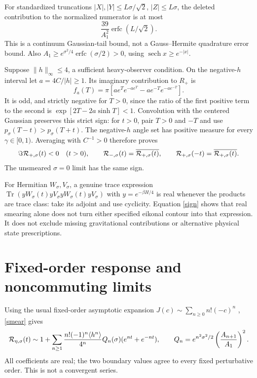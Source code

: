 \documentclass[11pt,a4paper]{article}
\begin{document}
For standardized truncations $|X|,|Y|\le L\sigma/\sqrt2$,
$|Z|\le L\sigma$, the deleted contribution to the normalized numerator
is at most
\[
 \frac{39}{A_1^2}\operatorname{erfc}(L/\sqrt2).
 \label{tail}
\]
This is a continuum Gaussian-tail bound, not a Gauss--Hermite
quadrature error bound. Also
$A_1\ge e^{\sigma^2/4}\operatorname{erfc}(\sigma/2)>0$,
using $\operatorname{sech}x\ge e^{-|x|}$.

Suppose $\|h\|_\infty\le4$, a sufficient heavy-observer condition.
On the negative-$h$ interval let $a=4C/|h|\ge1$. Its imaginary
contribution to $R_+$ is
\[
 f_a(T)=\pi\left[ae^T e^{-ae^T}-ae^{-T}e^{-ae^{-T}}\right].
\]
It is odd, and strictly negative for $T>0$, since the ratio of
the first positive term to the second is
$\exp[2T-2a\sinh T]<1$.
Convolution with the centered Gaussian preserves this strict sign:
for $t>0$, pair $T>0$ and $-T$ and use
$p_\sigma(T-t)>p_\sigma(T+t)$.
The negative-$h$ angle set has positive measure for every
$\gamma\in[0,1)$. Averaging with $C^{-1}>0$ therefore proves
\begin{equation}
 \Im{\cal R}_{+,\sigma}(t)<0\quad(t>0),\qquad
 {\cal R}_{-,\sigma}(t)=\overline{{\cal R}_{+,\sigma}(t)},\qquad
 {\cal R}_{+,\sigma}(-t)=\overline{{\cal R}_{+,\sigma}(t)} .
 \label{sign}
\end{equation}
The unsmeared $\sigma=0$ limit has the same sign.

For Hermitian $W_\sigma,V_\sigma$, a genuine trace expression
$\operatorname{Tr}(yW_\sigma(t)yV_\sigma yW_\sigma(t)yV_\sigma)$
with $y=e^{-\beta H/4}$ is real whenever the products are trace class:
take its adjoint and use cyclicity. Equation \eqref{sign} shows that
real smearing alone does not turn either specified eikonal contour
into that expression. It does not exclude missing gravitational
contributions or alternative physical state prescriptions.

\newpage
\section{Fixed-order response and noncommuting limits}
Using the usual fixed-order asymptotic expansion
$J(c)\sim\sum_{n\ge0}n!(-c)^n$ \cite{dlmf}, \eqref{smear} gives
\begin{equation}
 {\cal R}_{\eta,\sigma}(t)\sim
 1+\sum_{n\ge1}\frac{n!(-1)^n\langle h^n\rangle}{4^n}
 Q_n(\sigma)(e^{nt}+e^{-nt}),\qquad
 Q_n=e^{n^2\sigma^2/2}\left(\frac{A_{n+1}}{A_1}\right)^2 .
 \label{pert}
\end{equation}
All coefficients are real; the two boundary values agree to every
fixed perturbative order. This is not a convergent series.
\end{document}
